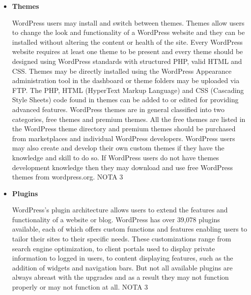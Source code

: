 \begin{itemize}
\item \textbf{Themes} 

WordPress users may install and switch between themes. Themes allow users to change the look and functionality of a WordPress website and they can be installed without altering the content or health of the site. Every WordPress website requires at least one theme to be present and every theme should be designed using WordPress standards with structured PHP, valid HTML and CSS. Themes may be directly installed using the WordPress Appearance administration tool in the dashboard or theme folders may be uploaded via FTP. The PHP, HTML (HyperText Markup Language) and CSS (Cascading Style Sheets) code found in themes can be added to or edited for providing advanced features. WordPress themes are in general classified into two categories, free themes and premium themes. All the free themes are listed in the WordPress theme directory and premium themes should be purchased from marketplaces and individual WordPress developers. WordPress users may also create and develop their own custom themes if they have the knowledge and skill to do so. If WordPress users do not have themes development knowledge then they may download and use free WordPress themes from wordpress.org. NOTA 3

\item \textbf{Plugins}

WordPress's plugin architecture allows users to extend the features and functionality of a website or blog. WordPress has over 39,078 plugins available, each of which offers custom functions and features enabling users to tailor their sites to their specific needs. These customizations range from search engine optimization, to client portals used to display private information to logged in users, to content displaying features, such as the addition of widgets and navigation bars. But not all available plugins are always abreast with the upgrades and as a result they may not function properly or may not function at all. NOTA 3

\end{itemize}